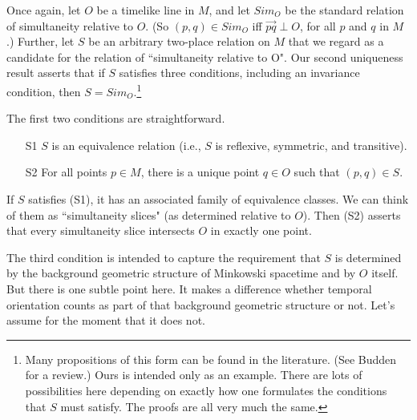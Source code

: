 \documentclass [12] {article}
\theoremstyle{plain}
\numberwithin{figure}{subsection}
\numberwithin{proposition}{subsection}
\begin{document}

Once again, let $O$ be a timelike line in $M$, and let $Sim_O$ be the standard relation of simultaneity relative to $O$. (So $(p,q)\in Sim_O$ iff  $\overrightarrow{pq} \perp O$, for all $p$ and $q$ in $M$.)  Further, let $S$  be an arbitrary two-place relation on $M$ that we regard as a candidate for the relation of ``simultaneity relative to O". Our second uniqueness result asserts that if $S$ satisfies three conditions, including an invariance condition,   then $S = Sim_O$.\footnote{Many propositions of this form can be found in the literature.  (See Budden  for a review.)  Ours is intended only as an example.  There are lots of possibilities here depending on exactly how one formulates the conditions that $S$ must satisfy. The proofs are all very much the same.}  

The first two conditions are straightforward.
%
\vspace{-.5em}
\begin{enumerate}
\item [S1] $S$ is an equivalence relation (i.e., $S$ is reflexive, symmetric, and transitive). 
\item[S2]  For all points $p \in M$, there is a unique point $q \in O$ such that  $(p, q) \in S$.
 \end{enumerate}
	
\noindent If $S$ satisfies (S1),  it has an associated family of equivalence classes.  We can think of them as ``simultaneity slices" (as determined relative to $O$). Then  (S2) asserts that every simultaneity slice intersects $O$ in exactly one point. 

The third condition  is intended to capture  the requirement that $S$ is determined by the background geometric structure of Minkowski spacetime and by $O$ itself.  But there is one subtle point here. It makes a difference whether  temporal orientation counts as part of that background geometric structure or not.  Let's assume for the moment that it does not. 
\end{document}
